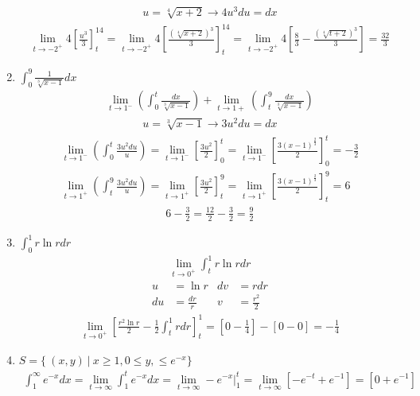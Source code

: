 \documentclass[12pt]{article}
\begin{document}
\begin{enumerate}
\begin{align*}
            u = \sqrt[4]{x+2} \to 4u^3du = dx
        \end{align*}
        \begin{align*}
            \lim_{t\to -2^+}4\left[\frac{u^3}{3}\right]_t^{14}
            =\lim_{t\to -2^+}4\left[\frac{(\sqrt[4]{x+2})^{3}}{3}\right]_t^{14}=\lim_{t\to -2^+}4\left[\frac{8}{3}-\frac{(\sqrt[4]{t+2})^3}{3}\right]= \frac{32}{3}
        \end{align*}\newpage
    \addtocounter{enumi}{3}\item $\int_0^9\frac{1}{\sqrt[3]{x-1}}dx$\
        \begin{align*}
            \lim_{t\to 1^-}\left(\int_0^t\frac{dx}{\sqrt[3]{x-1}}\right)
            +\lim_{t\to 1+}\left(\int_t^9\frac{dx}{\sqrt[3]{x-1}}\right)
        \end{align*}
        \begin{align*}
            u = \sqrt[3]{x-1} \to 3u^2du = dx
        \end{align*}
        \begin{align*}
            \lim_{t\to 1^-}\left(\int_0^t\frac{3u^2du}{u}\right) 
            =\lim_{t\to 1^-} \left[\frac{3u^2}{2}\right]_0^t
            =\lim_{t\to 1^-} \left[\frac{3(x-1)^{\frac{2}{3}}}{2}\right]_0^t 
            = -\frac{3}{2}\\
            \lim_{t\to 1^+}\left(\int_t^9\frac{3u^2du}{u}\right) 
            =\lim_{t\to 1^+} \left[\frac{3u^2}{2}\right]_t^9
            =\lim_{t\to 1^+} \left[\frac{3(x-1)^{\frac{2}{3}}}{2}\right]_t^9 
            = 6
        \end{align*}
        \begin{align*}
            6-\frac{3}{2} = \frac{12}{2}-\frac{3}{2} = \frac{9}{2}
        \end{align*}
    \addtocounter{enumi}{3}\item $\int_0^1r\ln{r}dr$
        \begin{align*}
            \lim_{t\to 0^+}\int_t^1r\ln{r}dr
        \end{align*}
        \begin{align*}
            u &= \ln{r} & dv &= rdr\\
            du &= \frac{dr}{r} & v &=\frac{r^2}{2}
        \end{align*}
        \begin{align*}
            \lim_{t\to 0^+}\left[\frac{r^2\ln{r}}{2}-\frac{1}{2}\int^1_trdr\right]^1_t 
            = \left[0-\frac{1}{4}\right]-\left[0-0\right]=-\frac{1}{4}
        \end{align*}\newpage
    \addtocounter{enumi}{3}\item $S=\{\ (x,y) \  | \ x \geq 1, 0 \leq y, \leq e^{-x}\}$
        \begin{align*}
            \int_1^\infty e^{-x}dx=\lim_{t\to\infty}\int^t_1e^{-x}dx=\lim_{t\to\infty}-e^{-x}\bigg|_1^t = \lim_{t\to\infty}\left[-e^{-t}+e^{-1}\right]=[0+e^{-1}]
        \end{align*}
\end{enumerate}
\end{document}
